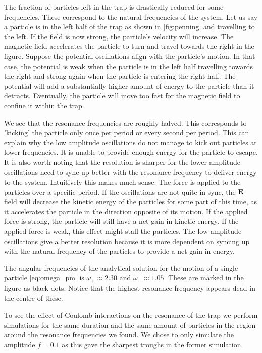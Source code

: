 The fraction of particles left in the trap is drastically reduced for some frequencies.
These correspond to the natural frequencies of the system.
Let us say a particle is in the left half of the trap as shown in \autoref{fig:penning} and travelling to the
left. If the field is now strong, the particle's velocity will increase. The magnetic field accelerates the
particle to turn and travel towards the right in the figure. Suppose the potential oscillations align with
the particle's motion. In that case, the potential is weak when the particle is in the left half travelling
towards the right and strong again when the particle is entering the right half. The potential will add
a substantially higher amount of energy to the particle than it detracts. Eventually, the particle will
move too fast for the magnetic field to confine it within the trap.

We see that the resonance frequencies are roughly halved. This corresponds to 'kicking' the particle only once per period or every second per period. This can explain why the low amplitude oscillations do not manage to kick out particles at lower frequencies. It is unable to provide enough energy for the particle to escape. It is also worth noting that the resolution is sharper for
the lower amplitude oscillations need to sync up better with the resonance frequency to deliver energy to the system.
Intuitively this makes much sense. The force is applied to the particles over a specific period. If the oscillations are not quite in
sync, the $\bold{E}$-field will decrease the kinetic energy of the particles for some part of this time, as it accelerates the particle in the
direction opposite of its motion. If the applied force is strong, the particle will still have a net gain in kinetic energy. If the applied force is
weak, this effect might stall the particles. The low amplitude oscillations give a better resolution because it is more dependent on syncing
 up with the natural frequency of the particles to provide a net gain in energy.

The angular frequencies of the analytical solution for the motion of a single particle \ref{eq:omega_pm} is $\omega_{+} \approx 2.30$ and $\omega_{-} \approx 1.05$. These are marked in the figure
as black dots. Notice that the highest resonance frequency appears dead in the centre of these.


To see the effect of Coulomb interactions on the resonance of the trap
we perform simulations for the same duration and the same amount of particles
in the region around the resonance frequencies we
found. We chose to only simulate the amplitude $f = 0.1$ as this gave the sharpest troughs
in the former simulation.

